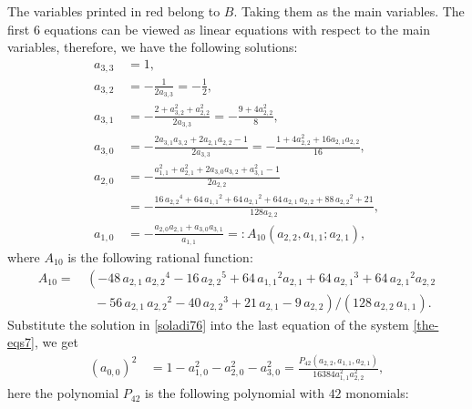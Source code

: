 \documentclass[runningheads]{llncs}
\begin{document}
The variables printed in red belong to $B$. Taking them as the main variables. The first $6$ equations can be viewed as linear equations with respect to the main variables, therefore, we have the following solutions: 
\begin{align}
a_{3,3}\,&=1,\nonumber \\
a_{3,2}\,&=-\frac{1}{2a_{3,3}}=-\frac{1}{2},\nonumber \\
a_{3,1}\,&=-\frac{2+a_{3,2}^2+a_{2,2}^2}{2a_{3,3}}=-\frac{9+4a_{2,2}^2}{8},\nonumber \\
a_{3,0}\,&=-\frac{2a_{3,1}a_{3,2}+2a_{2,1}a_{2,2}-1}{2a_{3,3}}=-\frac{1+4a_{2,2}^2+16a_{2,1}a_{2,2}}{16},\nonumber \\
a_{2,0}\,&=-\frac{a_{1,1}^2+a_{2,1}^2+2a_{3,0}a_{3,2}+a_{3,1}^2-1}{2a_{2,2}}\nonumber \\
\,&=-\frac{16\,{{ a_{2,2}}}^{4}+64\,{{ a_{1,1}}}^{2}+64\,{{ a_{2,1}}}^{2}+64\,{ a_{2,1}}\,{ a_{2,2}}+88\,{{ a_{2,2}}}^{2}+21}
{128a_{2,2}},\nonumber \\
a_{1,0}\,&=-\frac{a_{2,0}a_{2,1}+a_{3,0}a_{3,1}}{a_{1,1}}=:A_{10}(a_{2,2},a_{1,1};a_{2,1}),
\label{soladi76} 
\end{align}
where $A_{10}$ is the following rational function:
\begin{align*}
{ A_{10}}=&\,\left(-48\,{ a_{2,1}}\,{{ a_{2,2}}}^{4}-16\,{{ a_{2,2}}}^{5}
 +64\,{{ a_{1,1}}}^{2}{ a_{2,1}}+64\,{{ a_{2,1}}}^{3}+64\,{{ a_{2,1}}}^{2}{ a_{2,2}}\right.\\
&\,\left.\phantom{x}-56\,{ a_{2,1}}\,{{ a_{2,2}}}^{2}-40\,{{ a_{2,2}}}^{3}+21\,{ a_{2,1}}-9\,{ a_{2,2}}\right)
/\left({128\,{ a_{2,2}}\,{ a_{1,1}}}\right). 
\end{align*}
Substitute the solution in \eqref{soladi76} into the last equation of the system \eqref{the-eqs7}, we get
\begin{align}
(a_{0,0})^2\,&=1-a_{1,0}^2-a_{2,0}^2-a_{3,0}^2
=\frac{P_{42}(a_{2,2},a_{1,1},a_{2,1})}{16384a_{1,1}^2a_{2,2}^2},
\label{soladi70}
\end{align}
here the polynomial $P_{42}$
is the following polynomial with $42$ monomials:
\end{document}
